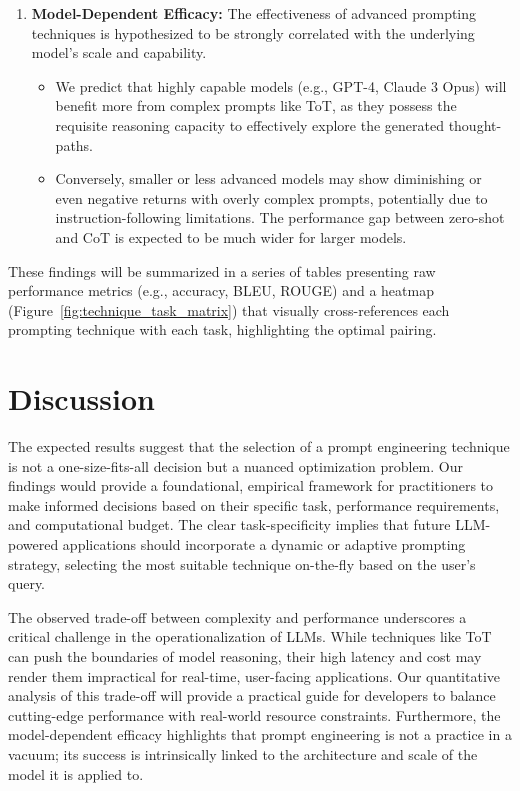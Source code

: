 \documentclass{article}
\begin{document}
\begin{enumerate}
    \item \textbf{Model-Dependent Efficacy:} The effectiveness of advanced prompting techniques is hypothesized to be strongly correlated with the underlying model's scale and capability.
    \begin{itemize}
        \item We predict that highly capable models (e.g., GPT-4, Claude 3 Opus) will benefit more from complex prompts like ToT, as they possess the requisite reasoning capacity to effectively explore the generated thought-paths.
        \item Conversely, smaller or less advanced models may show diminishing or even negative returns with overly complex prompts, potentially due to instruction-following limitations. The performance gap between zero-shot and CoT is expected to be much wider for larger models.
    \end{itemize}
\end{enumerate}

These findings will be summarized in a series of tables presenting raw performance metrics (e.g., accuracy, BLEU, ROUGE) and a heatmap (Figure~\ref{fig:technique_task_matrix}) that visually cross-references each prompting technique with each task, highlighting the optimal pairing.

\section{Discussion}

The expected results suggest that the selection of a prompt engineering technique is not a one-size-fits-all decision but a nuanced optimization problem. Our findings would provide a foundational, empirical framework for practitioners to make informed decisions based on their specific task, performance requirements, and computational budget. The clear task-specificity implies that future LLM-powered applications should incorporate a dynamic or adaptive prompting strategy, selecting the most suitable technique on-the-fly based on the user's query.

The observed trade-off between complexity and performance underscores a critical challenge in the operationalization of LLMs. While techniques like ToT can push the boundaries of model reasoning, their high latency and cost may render them impractical for real-time, user-facing applications. Our quantitative analysis of this trade-off will provide a practical guide for developers to balance cutting-edge performance with real-world resource constraints. Furthermore, the model-dependent efficacy highlights that prompt engineering is not a practice in a vacuum; its success is intrinsically linked to the architecture and scale of the model it is applied to.
\end{document}
